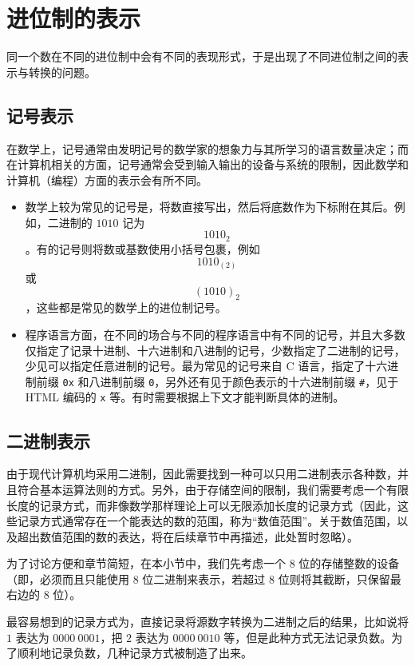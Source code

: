 \section{进位制的表示}\label{sec:ArithBasics/positional-notation-presentation}
    同一个数在不同的进位制中会有不同的表现形式，于是出现了不同进位制之间的表示与转换的问题。
    \subsection{记号表示}\label{subsec:ArithBasics/positional-notation-presentation/natural}
        在数学上，记号通常由发明记号的数学家的想象力与其所学习的语言数量决定；而在计算机相关的方面，记号通常会受到输入输出的设备与系统的限制，因此数学和计算机（编程）方面的表示会有所不同。
        \begin{itemize}
            \item 数学上较为常见的记号是，将数直接写出，然后将底数作为下标附在其后。例如，二进制的 $1010$ 记为\[1010_2\]。有的记号则将数或基数使用小括号包裹，例如\[1010_{(2)}\]或\[(1010)_2\]，这些都是常见的数学上的进位制记号。
            \item 程序语言方面，在不同的场合与不同的程序语言中有不同的记号，并且大多数仅指定了记录十进制、十六进制和八进制的记号，少数指定了二进制的记号，少见可以指定任意进制的记号。最为常见的记号来自 C 语言，指定了十六进制前缀 \texttt{0x} 和八进制前缀 \texttt{0}，另外还有见于颜色表示的十六进制前缀 \texttt{\#}，见于 HTML 编码的 \texttt{x} 等。有时需要根据上下文才能判断具体的进制。
        \end{itemize}
    \subsection{二进制表示}\label{subsec:ArithBasics/positional-notation-presentation/binary}
        由于现代计算机均采用二进制，因此需要找到一种可以只用二进制表示各种数，并且符合基本运算法则的方式。另外，由于存储空间的限制，我们需要考虑一个有限长度的记录方式，而非像数学那样理论上可以无限添加长度的记录方式（因此，这些记录方式通常存在一个能表达的数的范围，称为“数值范围”。关于数值范围，以及超出数值范围的数的表达，将在后续章节中再描述，此处暂时忽略）。

        为了讨论方便和章节简短，在本小节中，我们先考虑一个 $8$ 位的存储整数的设备（即，必须而且只能使用 $8$ 位二进制来表示，若超过 $8$ 位则将其截断，只保留最右边的 $8$ 位）。

        最容易想到的记录方式为，直接记录将源数字转换为二进制之后的结果，比如说将 $1$ 表达为 $0000\ 0001$，把 $2$ 表达为 $0000\ 0010$ 等，但是此种方式无法记录负数。为了顺利地记录负数，几种记录方式被制造了出来。

